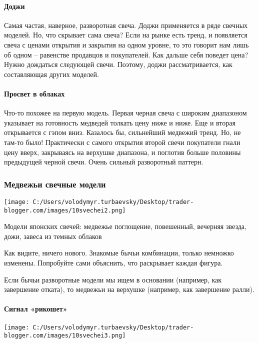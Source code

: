 \documentclass[a5paper]{article}
\begin{document}
\paragraph{Доджи}

Самая частая, наверное, разворотная свеча. Доджи применяется в ряде
свечных моделей. Но, что скрывает сама свеча? Если на рынке есть
тренд, и появляется свеча с ценами открытия и закрытия на одном
уровне, то это говорит нам лишь об одном – равенстве продавцов и
покупателей. Как дальше себя поведет цена? Нужно дождаться следующей
свечи. Поэтому, доджи рассматривается, как составляющая других
моделей.

\paragraph{Просвет в облаках}

Что-то похожее на первую модель. Первая черная свеча с широким
диапазоном указывает на готовность медведей толкать цену ниже и
ниже. Еще и вторая открывается с гэпом вниз. Казалось бы, сильнейший
медвежий тренд. Но, не там-то было! Практически с самого открытия
второй свечи покупатели гнали цену вверх, закрываясь на верхушке
диапазона, и поглотив больше половины предыдущей черной свечи. Очень
сильный разворотный паттерн.

\subsubsection{Медвежьи свечные модели}

\texttt{[image: C:/Users/volodymyr.turbaevsky/Desktop/trader-blogger.com/images/10svechei2.png]}

Модели японских свечей: медвежье поглощение, повешенный, вечерняя звезда, дожи, завеса из темных облаков

Как видите, ничего нового. Знакомые бычьи комбинации, только немножко изменены. Попробуйте сами объяснить, что раскрывает каждая фигура.

Если бычьи разворотные модели мы ищем в основании (например, как
завершение отката), то медвежьи на верхушке (например, как завершение
ралли).

\paragraph{Сигнал «рикошет»}

\texttt{[image: C:/Users/volodymyr.turbaevsky/Desktop/trader-blogger.com/images/10svechei3.png]}
\end{document}
